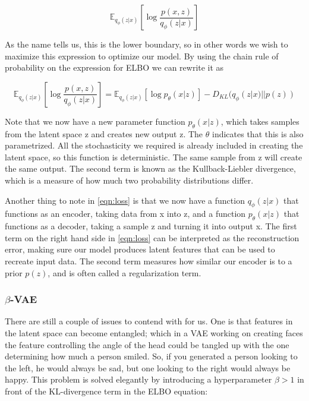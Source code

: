 \begin{equation}\label{eqn:elbo}
 \mathbb{E}_{q_\phi(z|x)}\left[\log \frac{p(x,z)}{q_\phi(z|x)}  \right]
\end{equation}

As the name tells us, this is the lower boundary, so in other words we wish to maximize this expression to optimize our model. By using the chain rule of probability on the expression for ELBO we can rewrite it as

\begin{equation}\label{eqn:loss}
 \mathbb{E}_{q_\phi(z|x)}\left[\log \frac{p(x,z)}{q_\phi(z|x)}  \right]
 = \mathbb{E}_{q_\phi(z|x)}[\log p_\theta (x|z)] -D_{KL}(q_\phi(z|x)||p(z))
\end{equation}

Note that we now have a new parameter function $p_\theta(x|z)$, which takes samples from the latent space z and creates new output z. The $\theta$ indicates that this is also parametrized. All the stochasticity we required is already included in creating the latent space, so this function is deterministic. The same sample from z will create the same output. The second term is known as the Kullback-Liebler divergence, which is a measure of how much two probability distributions differ.

Another thing to note in \autoref{eqn:loss} is that we now have a function $q_\phi(z|x)$ that functions as an encoder, taking data from x into z, and a function $p_\theta(x|z)$ that functions as a decoder, taking a sample z and turning it into output x.
The first term on the right hand side in \autoref{eqn:loss} can be interpreted as the reconstruction error, making sure our model produces latent features that can be used to recreate input data. The second term measures how similar our encoder is to a prior $p(z)$, and is often called a regularization term. \\ 

\subsubsection{$\beta$-VAE}
There are still a couple of issues to contend with for us. One is that features in the latent space can become entangled; which in a VAE working on creating faces the feature controlling the angle of the head could be tangled up with the one determining how much a person smiled. So, if you generated a person looking to the left, he would always be sad, but one looking to the right would always be happy. This problem is solved elegantly by introducing a hyperparameter $\beta >1$ in front of the KL-divergence term in the ELBO equation:

